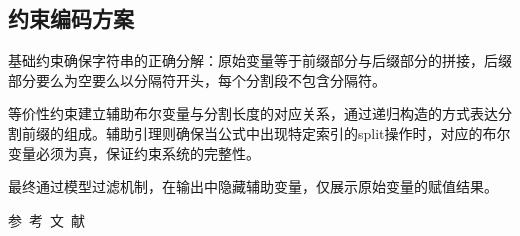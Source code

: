 \documentclass[10.5pt,compsoc,UTF8]{CjC}
\theoremstyle{mystyle}
\begin{document}
\subsection{约束编码方案}

基础约束确保字符串的正确分解：原始变量等于前缀部分与后缀部分的拼接，后缀部分要么为空要么以分隔符开头，每个分割段不包含分隔符。

等价性约束建立辅助布尔变量与分割长度的对应关系，通过递归构造的方式表达分割前缀的组成。辅助引理则确保当公式中出现特定索引的split操作时，对应的布尔变量必须为真，保证约束系统的完整性。

最终通过模型过滤机制，在输出中隐藏辅助变量，仅展示原始变量的赋值结果。






\vspace {10mm}
\centerline
{\textsf{参~考~文~献}}
 \addtolength{\itemsep}{-1em}
\vspace {1.5mm}


\end{document}
